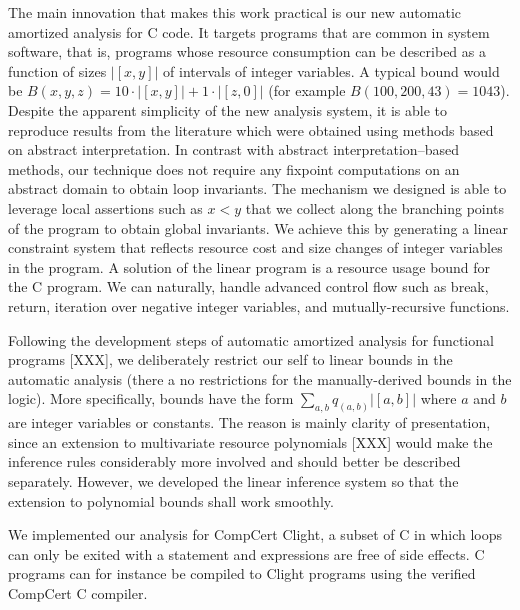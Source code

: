 \documentclass[nocopyrightspace,preprint]{sigplanconf}
\begin{document}
The main innovation that makes this work practical is our new
automatic amortized analysis for C code.  It targets programs that are
common in system software, that is, programs whose resource
consumption can be described as a function of sizes $|[x,y]|$ of
intervals of integer variables.  A typical bound would be $B(x,y,z) =
10{\cdot}|[x,y]| + 1{\cdot}|[z,0]|$ (for example $B(100,200,43) =
1043$).
%
Despite the apparent simplicity of the new analysis system, it is able
to reproduce results from the literature which were obtained using
methods based on abstract interpretation.  In contrast with abstract
interpretation--based methods, our technique does not require any
fixpoint computations on an abstract domain to obtain loop invariants.
The mechanism we designed is able to leverage local assertions such as
$x < y$ that we collect along the branching points of the program to
obtain global invariants.  We achieve this by generating a linear
constraint system that reflects resource cost and size changes of
integer variables in the program.  A solution of the linear program is
a resource usage bound for the C program.  We can naturally, handle
advanced control flow such as break, return, iteration over negative
integer variables, and mutually-recursive functions.

Following the development steps of automatic amortized analysis for
functional programs [XXX], we deliberately restrict our self to linear
bounds in the automatic analysis (there a no restrictions for the
manually-derived bounds in the logic).  More specifically, bounds have
the form $\sum_{a,b} q_{(a,b)} |[a,b]|$ where $a$ and $b$ are integer
variables or constants.  The reason is mainly clarity of presentation,
since an extension to multivariate resource polynomials [XXX] would
make the inference rules considerably more involved and should
better be described separately.  However, we developed the linear
inference system so that the extension to polynomial bounds shall
work smoothly.  

We implemented our analysis for CompCert Clight, a subset of C in
which loops can only be exited with a  statement and
expressions are free of side effects.  C programs can for instance be
compiled to Clight programs using the verified CompCert C compiler.
\end{document}
